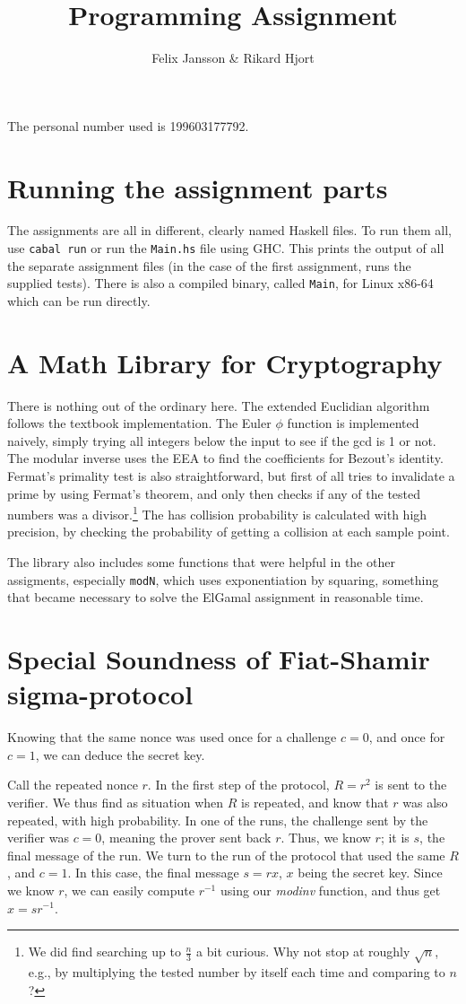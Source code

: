 \documentclass{article}
\author{Felix Jansson \& Rikard Hjort}
\title{Programming Assignment}
\begin{document}
The personal number used is 199603177792.

\section{Running the assignment parts}
The assignments are all in different, clearly named Haskell files. To run them
all, use \texttt{cabal run} or run the \texttt{Main.hs} file using GHC. This
prints the output of all the separate assignment files (in the case of the first
assignment, runs the supplied tests). There is also a compiled binary, called
\texttt{Main}, for Linux x86-64 which can be run directly.

\section{A Math Library for Cryptography}
There is nothing out of the ordinary here. The extended Euclidian algorithm
follows the textbook implementation. The Euler $\phi$ function is implemented
naively, simply trying all integers below the input to see if the gcd is 1 or
not. The modular inverse uses the EEA to find the coefficients for Bezout's
identity. Fermat's primality test is also straightforward, but first of all
tries to invalidate a prime by using Fermat's theorem, and only then checks if
any of the tested numbers was a divisor.\footnote{We did find searching up to
  $\frac{n}{3}$ a bit curious. Why not stop at roughly $\sqrt{n}$, e.g., by
  multiplying the tested number by itself each time and comparing to $n$?} The
has collision probability is calculated with high precision, by checking the
probability of getting a collision at each sample point.

The library also includes some functions that were helpful in the other
assigments, especially \texttt{modN}, which uses exponentiation by squaring,
something that became necessary to solve the ElGamal assignment in reasonable time.

\section{Special Soundness of Fiat-Shamir sigma-protocol}
Knowing that the same nonce was used once for a challenge $c=0$, and once for
$c=1$, we can deduce the secret key.

Call the repeated nonce $r$. In the first step of the protocol, $R=r^2$ is sent
to the verifier. We thus find as situation when $R$ is repeated, and know that
$r$ was also repeated, with high probability. In one of the runs, the
challenge sent by the verifier was $c=0$, meaning the prover sent back $r$.
Thus, we know $r$; it is $s$, the final message of the run. We turn to the run
of the protocol that used the same $R$, and $c=1$. In this case, the final
message $s=rx$, $x$ being the secret key. Since we know $r$, we can easily
compute $r^{-1}$ using our \textit{modinv} function, and thus get $x=sr^{-1}$.
\end{document}
